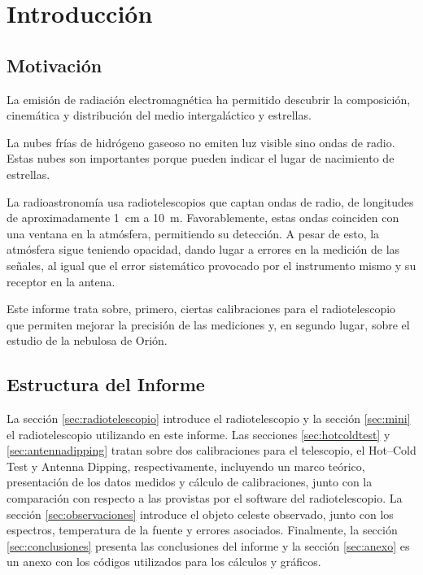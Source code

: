 \section{Introducción}

\subsection{Motivación}

La emisión de radiación electromagnética ha permitido descubrir la composición, cinemática y distribución del medio intergaláctico y estrellas.

La nubes frías de hidrógeno gaseoso no emiten luz visible sino ondas de radio. Estas nubes son importantes porque pueden indicar el lugar de nacimiento de estrellas.

La radioastronomía usa radiotelescopios que captan ondas de radio, de longitudes de aproximadamente \SI{1}{\centi\meter} a \SI{10}{\meter}. Favorablemente, estas ondas coinciden con una ventana en la atmósfera, permitiendo su detección. A pesar de esto, la atmósfera sigue teniendo opacidad, dando lugar a errores en la medición de las señales, al igual que el error sistemático provocado por el instrumento mismo y su receptor en la antena.

Este informe trata sobre, primero, ciertas calibraciones para el radiotelescopio que permiten mejorar la precisión de las mediciones y, en segundo lugar, sobre el estudio de la nebulosa de Orión.

\subsection{Estructura del Informe}

La sección \ref{sec:radiotelescopio} introduce el radiotelescopio y la sección \ref{sec:mini} el radiotelescopio utilizando en este informe. Las secciones \ref{sec:hotcoldtest} y \ref{sec:antennadipping} tratan sobre dos calibraciones para el telescopio, el Hot--Cold Test y Antenna Dipping, respectivamente, incluyendo un marco teórico, presentación de los datos medidos y cálculo de calibraciones, junto con la comparación con respecto a las provistas por el software del radiotelescopio. La sección \ref{sec:observaciones} introduce el objeto celeste observado, junto con los espectros, temperatura de la fuente y errores asociados. Finalmente, la sección \ref{sec:conclusiones} presenta las conclusiones del informe y la sección \ref{sec:anexo} es un anexo con los códigos utilizados para los cálculos y gráficos.

